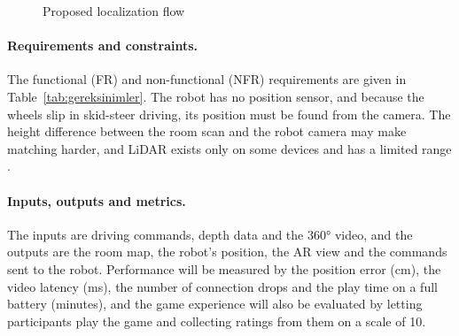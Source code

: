 \documentclass[11pt,a4paper]{article}
\begin{document}
\begin{figure}[H]
\centering
{}
\caption{Proposed localization flow}
\label{fig:konum_akisi}
\end{figure}

\paragraph{Requirements and constraints.}
The functional (FR) and non-functional (NFR) requirements are given in Table~\ref{tab:gereksinimler}. The robot has no position sensor, and because the wheels slip in skid-steer driving, its position must be found from the camera. The height difference between the room scan and the robot camera may make matching harder, and LiDAR exists only on some devices and has a limited range \cite{luetzenburg2021iphone}.

\paragraph{Inputs, outputs and metrics.}
The inputs are driving commands, depth data and the 360° video, and the outputs are the room map, the robot's position, the AR view and the commands sent to the robot. Performance will be measured by the position error (cm), the video latency (ms), the number of connection drops and the play time on a full battery (minutes), and the game experience will also be evaluated by letting participants play the game and collecting ratings from them on a scale of 10.
\end{document}

